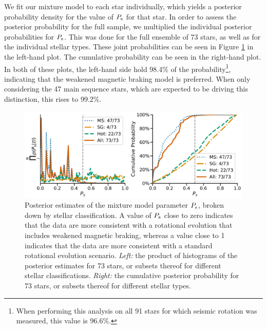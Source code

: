 \documentclass[12pt]{article}
\begin{document}
We fit our mixture model to each star individually, which yields a posterior probability density for the value of $P_{\rm s}$ for that star. In order to assess the posterior probability for the full sample, we multiplied the individual posterior probabilities for $P_{\rm s}$. This was done for the full ensemble of 73 stars, as well as for the individual stellar types. These joint probabilities can be seen in Figure \ref{fig:gyroresults} in the left-hand plot. The cumulative probability can be seen in the right-hand plot. In both of these plots, the left-hand side hold 98.4\% of the probability\footnote{When performing this analysis on all 91 stars for which seismic rotation was measured, this value is 96.6\%.}, indicating that the weakened magnetic braking model is preferred. When only considering the 47 main sequence stars, which are expected to be driving this distinction, this rises to 99.2\%. \\

\begin{figure}
	\centering
	\includegraphics[width=\textwidth]{modelresults.pdf}
	\caption{Posterior estimates of the mixture model parameter $P_{\rm s}$, broken down by stellar classification. A value of $P_{\rm s}$ close to zero indicates that the data are more consistent with a rotational evolution that includes weakened magnetic braking, whereas a value close to 1 indicates that the data are more consistent with a standard rotational evolution scenario. \textit{Left:} the product of histograms of the posterior estimates for 73 stars, or subsets thereof for different stellar classifications. \textit{Right:} the cumulative posterior probability for 73 stars, or subsets thereof for different stellar types.}
	\label{fig:gyroresults}
\end{figure}
\end{document}
